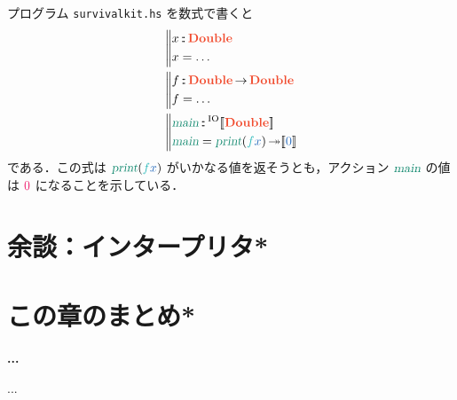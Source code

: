 \documentclass[a5paper,twoside,fleqn,draft]{jsbook}
\def\[{[\![}
\def\]{]\!]}
\def\constantColor{WildStrawberry}
\def\varColor{NavyBlue}
\def\funcColor{BlueGreen}
\def\actionColor{PineGreen}
\def\typeColor{RedOrange}
\newenvironment{note}[1]{\begin{boxnote}\begin{center}\textbf{#1}\end{center}}{\end{boxnote}}
\newcommand{\filename}[1]{\texttt{#1}}
\newcommand{\mBrace}{\Vert}
\newcommand{\mConstant}[1]{\textcolor{\constantColor}{#1}}
\newcommand{\mZeroNumber}{{\mConstant{0}}}
\newcommand{\mVar}[1]{\textcolor{\varColor}{#1}}
\newcommand{\mXVar}{\mVar{x}}
\newcommand{\mFunc}[1]{\textcolor{\funcColor}{#1}}
\newcommand{\mFFunc}{{\mFunc{f}}}
\newcommand{\mActionLong}[1]{\textcolor{\actionColor}{\textsl{#1}}}
\DeclareMathOperator{\mMain}{\mActionLong{main}}
\DeclareMathOperator{\mPrint}{\mActionLong{print}}
\DeclareMathOperator{\mBindRightIgnore}{\twoheadrightarrow}
\DeclareMathOperator{\mFuncArrow}{\rightarrow}
\DeclareMathOperator{\mIn}{{:\!:}}
\newcommand{\mType}[1]{\textcolor{\typeColor}{\mathbf{#1}}}
\newcommand{\mDoubleType}{\mType{Double}}
\newcommand{\mTypeAssemble}[2]{{}^\mathrm{#1}\[\mType{#2}\]}
\newcommand{\mIOType}[1]{\mTypeAssemble{IO}{#1}}
\newcommand{\mIODoubleType}{\mIOType{\mDoubleType}}
\newcommand{\mPureWith}[1]{\[\mVar{#1}\]}
\newcommand{\mProjEXP}[2]{#1\mFuncArrow#2} %
\begin{document}
プログラム \filename{survivalkit.hs} を数式で書くと
\begin{align}
  {}&\left\mBrace
    \begin{aligned}
      x&\mIn\mDoubleType\\
      x&=\dots\\
    \end{aligned}
    \right.\\
  {}&\left\mBrace
    \begin{aligned}
      f&\mIn{}\mProjEXP{\mDoubleType}{\mDoubleType}\\
      f&=\dots\\
    \end{aligned}
    \right.\\
  {}&\left\mBrace
    \begin{aligned}
      \mMain&\mIn{}\mIODoubleType\\
      \mMain&=\mPrint(\mFFunc\mXVar)\mBindRightIgnore\mPureWith{0}
    \end{aligned}
    \right.
\end{align}
である．この式は $\mPrint(\mFFunc\mXVar)$ がいかなる値を返そうとも，アクション
$\mMain$ の値は $\mZeroNumber$ になることを示している．

\section{余談：インタープリタ*}

\section{この章のまとめ*}

\begin{note}{...}
...
\end{note}

\end{document}

